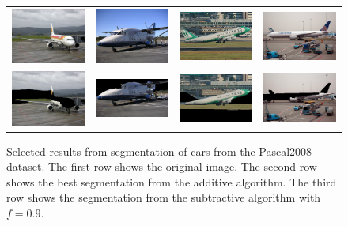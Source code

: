 \documentclass[10pt,twocolumn,letterpaper]{article}
\begin{document}
\begin{figure}[p]
\centering
\begin{tabular}{ p{3cm} p{3cm} p{3cm} p{3cm} }
\includegraphics[width=2.95cm]{figures/add_res/plane/2008_000804.jpg.eps} &
\includegraphics[width=2.95cm]{figures/add_res/plane/2008_001805.jpg.eps} &
\includegraphics[width=2.95cm]{figures/add_res/plane/2008_002358.jpg.eps} &
\includegraphics[width=2.95cm]{figures/add_res/plane/2008_003673.jpg.eps} \\
\includegraphics[width=2.95cm]{figures/add_res/plane/2008_000804.jpg_2_bad.jpg.eps} &
\includegraphics[width=2.95cm]{figures/add_res/plane/2008_001805.jpg_2_okay.jpg.eps} &
\includegraphics[width=2.95cm]{figures/add_res/plane/2008_002358.jpg_2_okay.jpg.eps} &
\includegraphics[width=2.95cm]{figures/add_res/plane/2008_003673.jpg_2_bad.jpg.eps} \\
\end{tabular}
\caption{Selected results from segmentation of cars from the Pascal2008
dataset.  The first row shows the original image.  The second row shows
the best segmentation from the additive algorithm.  The third row shows
the segmentation from the subtractive algorithm with $f=0.9$.}
\label{fig:aeroplane_bad_results}
\end{figure}
\end{document}
